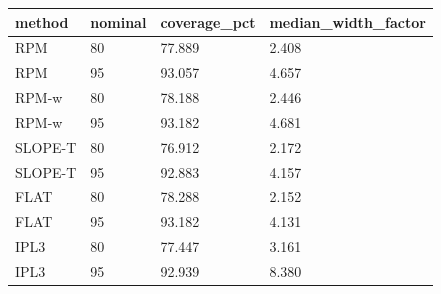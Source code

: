 \begin{tabular}{llll}
\hline
method & nominal & coverage\_pct & median\_width\_factor \\
\hline
RPM & 80 & 77.889 & 2.408 \\
RPM & 95 & 93.057 & 4.657 \\
RPM-w & 80 & 78.188 & 2.446 \\
RPM-w & 95 & 93.182 & 4.681 \\
SLOPE-T & 80 & 76.912 & 2.172 \\
SLOPE-T & 95 & 92.883 & 4.157 \\
FLAT & 80 & 78.288 & 2.152 \\
FLAT & 95 & 93.182 & 4.131 \\
IPL3 & 80 & 77.447 & 3.161 \\
IPL3 & 95 & 92.939 & 8.380 \\
\hline
\end{tabular}
